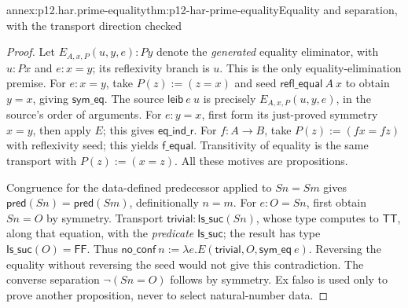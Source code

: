 \begin{annexitem}{annex:p12.har.prime-equality}{thm:p12-har-prime-equality}{Equality and separation, with the transport direction checked}
\begin{proof}
Let \(E_{A,x,P}(u,y,e):P y\) denote the \emph{generated} equality
eliminator, with \(u:P x\) and \(e:x=y\); its reflexivity branch is
\(u\). This is the only equality-elimination premise.
For \(e:x=y\), take \(P(z):=(z=x)\) and seed
\(\mathsf{refl\_equal}\ A\ x\) to obtain \(y=x\), giving
\(\mathsf{sym\_eq}\). The source \(\mathsf{leib}\ e\ u\) is precisely
\(E_{A,x,P}(u,y,e)\), in the source's order of arguments.
For \(e:y=x\), first form its just-proved symmetry \(x=y\), then
apply \(E\); this gives \(\mathsf{eq\_ind\_r}\).
For \(f:A\to B\), take \(P(z):=(f x=f z)\) with reflexivity seed;
this yields \(\mathsf{f\_equal}\). Transitivity of equality is the
same transport with \(P(z):=(x=z)\). All these motives are propositions.

Congruence for the data-defined predecessor applied to \(S n=S m\)
gives \(\mathsf{pred}(S n)=\mathsf{pred}(S m)\), definitionally \(n=m\).
For \(e:O=S n\), first obtain \(S n=O\) by symmetry. Transport
\(\mathsf{trivial}:\mathsf{Is\_suc}(S n)\), whose type computes to
\(\mathsf{TT}\), along that
equation, with the \emph{predicate} \(\mathsf{Is\_suc}\); the result
has type \(\mathsf{Is\_suc}(O)=\mathsf{FF}\). Thus
\(\mathsf{no\_conf}\ n:=\lambda e.E(\mathsf{trivial},O,
\mathsf{sym\_eq}\ e)\). Reversing the equality without reversing
the seed would not give this contradiction. The converse separation
\(\neg(S n=O)\) follows by symmetry. Ex falso is used only to
prove another proposition, never to select natural-number data.
\end{proof}
\end{annexitem}

